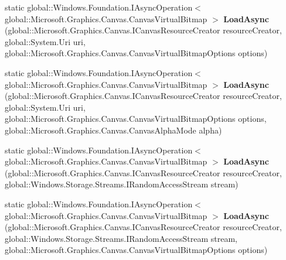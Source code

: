 \begin{DoxyCompactItemize}
\item 
\mbox{\label{class_microsoft_1_1_graphics_1_1_canvas_1_1_canvas_virtual_bitmap_acd074c002643745470070fedca4bc142}} 
static global\+::\+Windows.\+Foundation.\+I\+Async\+Operation$<$ global\+::\+Microsoft.\+Graphics.\+Canvas.\+Canvas\+Virtual\+Bitmap $>$ {\bfseries Load\+Async} (global\+::\+Microsoft.\+Graphics.\+Canvas.\+I\+Canvas\+Resource\+Creator resource\+Creator, global\+::\+System.\+Uri uri, global\+::\+Microsoft.\+Graphics.\+Canvas.\+Canvas\+Virtual\+Bitmap\+Options options)
\item 
\mbox{\label{class_microsoft_1_1_graphics_1_1_canvas_1_1_canvas_virtual_bitmap_accb66d38d50f8d67a23664ce8819c262}} 
static global\+::\+Windows.\+Foundation.\+I\+Async\+Operation$<$ global\+::\+Microsoft.\+Graphics.\+Canvas.\+Canvas\+Virtual\+Bitmap $>$ {\bfseries Load\+Async} (global\+::\+Microsoft.\+Graphics.\+Canvas.\+I\+Canvas\+Resource\+Creator resource\+Creator, global\+::\+System.\+Uri uri, global\+::\+Microsoft.\+Graphics.\+Canvas.\+Canvas\+Virtual\+Bitmap\+Options options, global\+::\+Microsoft.\+Graphics.\+Canvas.\+Canvas\+Alpha\+Mode alpha)
\item 
\mbox{\label{class_microsoft_1_1_graphics_1_1_canvas_1_1_canvas_virtual_bitmap_a56e5e79a80dccfdc011f98e647de9bcf}} 
static global\+::\+Windows.\+Foundation.\+I\+Async\+Operation$<$ global\+::\+Microsoft.\+Graphics.\+Canvas.\+Canvas\+Virtual\+Bitmap $>$ {\bfseries Load\+Async} (global\+::\+Microsoft.\+Graphics.\+Canvas.\+I\+Canvas\+Resource\+Creator resource\+Creator, global\+::\+Windows.\+Storage.\+Streams.\+I\+Random\+Access\+Stream stream)
\item 
\mbox{\label{class_microsoft_1_1_graphics_1_1_canvas_1_1_canvas_virtual_bitmap_a8cdd19fd36f49f203d6c0998ace732d1}} 
static global\+::\+Windows.\+Foundation.\+I\+Async\+Operation$<$ global\+::\+Microsoft.\+Graphics.\+Canvas.\+Canvas\+Virtual\+Bitmap $>$ {\bfseries Load\+Async} (global\+::\+Microsoft.\+Graphics.\+Canvas.\+I\+Canvas\+Resource\+Creator resource\+Creator, global\+::\+Windows.\+Storage.\+Streams.\+I\+Random\+Access\+Stream stream, global\+::\+Microsoft.\+Graphics.\+Canvas.\+Canvas\+Virtual\+Bitmap\+Options options)

\end{DoxyCompactItemize}
